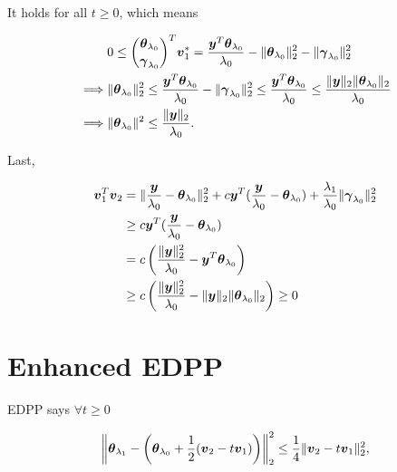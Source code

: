 It holds for all $t\geq 0$, which means

\begin{gather}
    \begin{aligned}
        &0\leq\binom{\boldsymbol\theta_{\lambda_0}}{\boldsymbol\gamma_{\lambda_0}}^T\boldsymbol v_1^*=\frac{\boldsymbol y^T\boldsymbol\theta_{\lambda_0}}{\lambda_0}-\lVert\boldsymbol\theta_{\lambda_0}\rVert_2^2-\lVert\boldsymbol\gamma_{\lambda_0}\rVert_2^2\\
        \implies&\lVert\boldsymbol\theta_{\lambda_0}\rVert^2_2\leq\frac{\boldsymbol y^T\boldsymbol\theta_{\lambda_0}}{\lambda_0}-\lVert\boldsymbol\gamma_{\lambda_0}\rVert_2^2\leq\frac{\boldsymbol y^T\boldsymbol\theta_{\lambda_0}}{\lambda_0}\leq \frac{\lVert\boldsymbol y\rVert_2\lVert\boldsymbol\theta_{\lambda_0}\rVert_2}{\lambda_0}\\
        \implies&\lVert\boldsymbol\theta_{\lambda_0}\rVert^2\leq\frac{\lVert\boldsymbol y\rVert_2}{\lambda_0}.
    \end{aligned}
\end{gather}

Last,

\begin{gather}
    \begin{aligned}
        \boldsymbol v_1^T\boldsymbol v_2&=\lVert\frac{\boldsymbol y}{\lambda_0}-\boldsymbol\theta_{\lambda_0}\rVert_2^2+c\boldsymbol y^T(\frac{\boldsymbol y}{\lambda_0}-\boldsymbol\theta_{\lambda_0})+\frac{\lambda_1}{\lambda_0}\lVert\boldsymbol\gamma_{\lambda_0}\rVert_2^2\\
        &\geq c\boldsymbol y^T(\frac{\boldsymbol y}{\lambda_0}-\boldsymbol\theta_{\lambda_0})\\
        &=c\left(\frac{\lVert\boldsymbol y\rVert_2^2}{\lambda_0}-\boldsymbol y^T\boldsymbol\theta_{\lambda_0}\right)\\
        &\geq c\left(\frac{\lVert\boldsymbol y\rVert_2^2}{\lambda_0}-\lVert\boldsymbol y\rVert_2\lVert\boldsymbol\theta_{\lambda_0}\rVert_2\right)\geq 0
    \end{aligned}
\end{gather}


\section{Enhanced EDPP}

EDPP says $\forall t\geq 0$

\begin{equation}
    \left\Vert\boldsymbol\theta_{\lambda_1}-\left(\boldsymbol\theta_{\lambda_0}+\frac{1}{2}(\boldsymbol v_2-t\boldsymbol v_1)\right)\right\Vert_2^2\leq\frac{1}{4}\lVert\boldsymbol v_2-t\boldsymbol v_1\rVert_2^2,
\end{equation}

